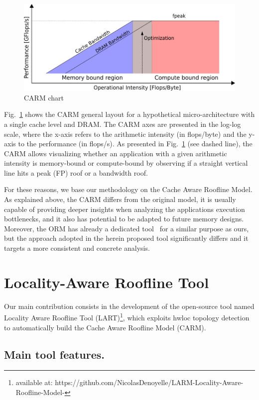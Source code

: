 \documentclass[twoside,twocolumn,9pt]{extarticle}
\begin{document}
\begin{figure}
  \centering
  \includegraphics[width=.48\textwidth]{pictures/CARM_chart.png}
  \caption{CARM chart}
  \label{fig:CARM_chart}
\end{figure}

Fig.~\ref{fig:CARM_chart} shows the CARM general layout for a hypothetical micro-architecture with a single cache level and DRAM.
The CARM axes are presented in the log-log scale, where the x-axis refers to the arithmetic intensity (in flops/byte) and the
y-axis to the performance (in flops/s). As presented in Fig.~\ref{fig:CARM_chart} (see dashed line), the CARM allows visualizing
whether an application with a given arithmetic intensity is memory-bound or compute-bound by observing if a straight vertical line
hits a peak (FP) roof or a bandwidth roof.

For these reasons, we base our methodology on the Cache Aware Roofline Model. 
As explained above, the CARM differs from the original model, it is usually capable of providing deeper insights when analyzing the
applications execution bottlenecks, and it also has potential to be adapted to future memory designs. Moreover, the ORM has already
a dedicated tool~\cite{Lo2015} for a similar purpose as ours, but the approach adopted in the herein proposed tool significantly
differs and it targets a more consistent and concrete analysis.

\section{Locality-Aware Roofline Tool}\label{sec:contrib}

Our main contribution consists in the development of the open-source tool named Locality Aware Roofline Tool (LART)\footnote{available at: https://github.com/NicolasDenoyelle/LARM-Locality-Aware-Roofline-Model-}, which
exploits hwloc topology detection to automatically build the Cache Aware Roofline Model (CARM).

\subsection{Main tool features.}
\label{sub:tool_features}
\end{document}
